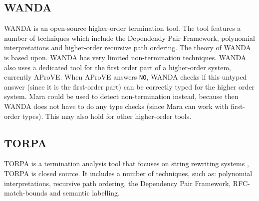 \subsection{WANDA}
WANDA is an open-source higher-order termination tool\cite{KOP:WANDASITE}. The tool features a number of techniques which include the Dependendy Pair Framework, polynomial interpretations and higher-order recursive path ordering. The theory of WANDA is based upon\cite{KOP:WANDA}. WANDA has very limited non-termination techniques. WANDA also uses a dedicated tool for the first order part of a higher-order system, currently AProVE. When AProVE answers \texttt{NO}, WANDA checks if this untyped answer (since it is the first-order part) can be correctly typed for the higher order system. Mara could be used to detect non-termination instead, because then WANDA does not have to do any type checks (since Mara can work with first-order types). This may also hold for other higher-order tools.

\subsection{TORPA}
TORPA is a termination analysis tool that focuses on string rewriting systems \cite{ZANTEMA:TORPA}, TORPA is closed source. It includes a number of techniques, such as: polynomial interpretations, recursive path ordering, the Dependency Pair Framework, RFC-match-bounds and semantic labelling. 